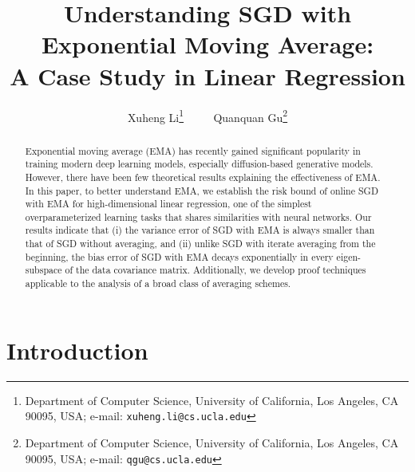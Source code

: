 \documentclass[11pt]{article}
\title{\huge Understanding SGD with Exponential Moving Average:\\ A Case Study in Linear Regression}
\author
{
    Xuheng Li\thanks{Department of Computer Science, University of California, Los Angeles, CA 90095, USA; e-mail: {\tt xuheng.li@cs.ucla.edu}}
    ~~~~
    Quanquan Gu\thanks{Department of Computer Science, University of California, Los Angeles, CA 90095, USA; e-mail: {\tt qgu@cs.ucla.edu}}
}
\begin{document}
    \date{}
    \maketitle

\begin{abstract}
Exponential moving average (EMA) has recently gained significant popularity in training modern deep learning models, especially diffusion-based generative models.
However, there have been few theoretical results explaining the effectiveness of EMA.
In this paper, to better understand EMA, we establish the risk bound of online SGD with EMA for high-dimensional linear regression, one of the simplest overparameterized learning tasks that shares similarities with neural networks.
Our results indicate that (i) the variance error of SGD with EMA is always smaller than that of SGD without averaging, and (ii) unlike SGD with iterate averaging from the beginning, the bias error of SGD with EMA decays exponentially in every eigen-subspace of the data covariance matrix.
Additionally, we develop proof techniques applicable to the analysis of a broad class of averaging schemes.
\end{abstract}

\section{Introduction}
\end{document}
